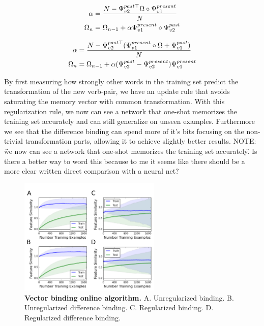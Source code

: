 \documentclass{article}
\begin{document}
\begin{align}
\label{eq:regularization_vec}
\notag \alpha &= \frac{N-\Psi^{past\top}_{v2} \Omega \circ \Psi^{present}_{v1}}{N}  \\
\Omega_n &= \Omega_{n-1} + \alpha \Psi^{present}_{v1} \circ \Psi^{past}_{v2}
\end{align}

\begin{align}
\label{eq:regularization_difference_vec}
\notag \alpha &= \frac{N-
\Psi^{past\top}_{v2} (\Psi^{present}_{v1} \circ \Omega+
\Psi^{past}_{v1})}{N} \\
\Omega_n &= \Omega_{n-1} + \alpha
(\Psi^{past}_{v2} - \Psi^{present}_{v2})
\Psi^{present}_{v1}
\end{align}

By first measuring how strongly other words in the training set predict the transformation of the new verb-pair, we have an update rule that avoids saturating the memory vector with common transformation. With this regularization rule, we now can see a network that one-shot memorizes the training set accurately and can still generalize on unseen examples. Furthermore we see that the difference binding can spend more of it's bits focusing on the non-trivial transformation parts, allowing it to achieve slightly better results.
NOTE: \" we now can see a network that one-shot memorizes the training set accurately\". Is there a better way to word this because to me it seems like there should be a more clear written direct comparison with a neural net?


\begin{figure}[h]
\centering
\includegraphics[width=0.6\textwidth]{vector_binding_algorithm-170518.png}
\caption{\textbf{Vector binding online algorithm.} A. Unregularized binding. B. Unregularized difference binding. C. Regularized binding. D. Regularized difference binding.}
\end{figure}
\end{document}
